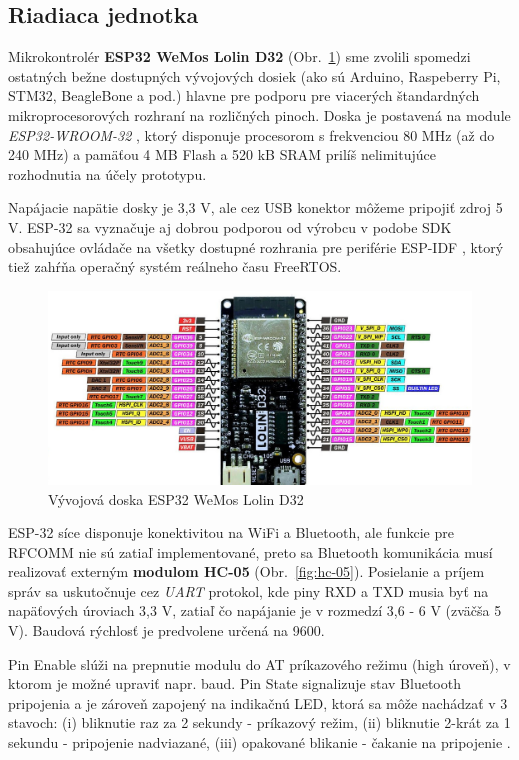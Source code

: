 \documentclass[12pt, a4paper]{article}
\begin{document}
\subsection{Riadiaca jednotka}
Mikrokontrolér \textbf{ESP32 WeMos Lolin D32} (Obr.~\ref{fig:esp32}) sme zvolili spomedzi ostatných bežne dostupných vývojových dosiek (ako sú Arduino, Raspeberry Pi, STM32, BeagleBone a pod.) hlavne pre podporu pre viacerých štandardných mikroprocesorových rozhraní na rozličných pinoch. Doska je postavená na module \emph{ESP32-WROOM-32} \cite{noauthor_esp32-wroom-32_2023}, ktorý disponuje procesorom s frekvenciou 80 MHz (až do 240 MHz) a pamäťou 4 MB Flash a 520 kB SRAM prilíš nelimitujúce rozhodnutia na účely prototypu. 

Napájacie napätie dosky je 3,3 V, ale cez USB konektor môžeme pripojiť zdroj 5 V. ESP-32 sa vyznačuje aj dobrou podporou od výrobcu v podobe SDK obsahujúce ovládače na všetky dostupné rozhrania pre periférie ESP-IDF \cite{noauthor_esp-idf_nodate}, ktorý tiež zahŕňa operačný systém reálneho času FreeRTOS.

\begin{figure}[h]
	\centering
	\includegraphics[width=\textwidth]{assets/esp32.jpg}
	\caption{Vývojová doska ESP32 WeMos Lolin D32 \cite{mischianti_esp32_2023}}
	\label{fig:esp32}
\end{figure}

ESP-32 síce disponuje konektivitou na WiFi a Bluetooth, ale funkcie pre RFCOMM nie sú zatiaľ implementované, preto sa Bluetooth komunikácia musí realizovať externým \textbf{modulom HC-05} (Obr.~\ref{fig:hc-05}). Posielanie a príjem správ sa uskutočnuje cez \emph{UART} protokol, kde piny RXD a TXD musia byť na napäťových úroviach 3,3 V, zatiaľ čo napájanie je v rozmedzí 3,6 - 6 V (zväčša 5 V). Baudová rýchlosť je predvolene určená na 9600. 

Pin Enable slúži na prepnutie modulu do AT príkazového režimu (high úroveň), v ktorom je možné upraviť napr. baud. Pin State signalizuje stav Bluetooth pripojenia a je zároveň zapojený na indikačnú LED, ktorá sa môže nachádzať v 3 stavoch: (i) bliknutie raz za 2 sekundy - príkazový režim, (ii) bliknutie 2-krát za 1 sekundu - pripojenie nadviazané, (iii) opakované blikanie - čakanie na pripojenie \cite{noauthor_hc-05_nodate}.
\end{document}
